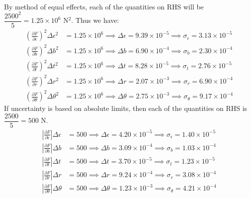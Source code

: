 \documentclass[a4paper, 11pt]{article}
\let\e\epsilon
\begin{document}
\begin{enumerate}[label=(\arabic*),leftmargin=*]
\begin{align*}
\end{align*}
By method of equal effects, each of the quantities on RHS will be $\dfrac{2500^2}{5}=1.25\times 10^6$ N$^2$. Thus we have:
\begin{align*}
	\left(\frac{\partial F}{\partial \e}\right)^2\Delta{\e}^2&=1.25\times 10^6\implies \Delta{\e}=9.39\times 10^{-5}\implies \boxed{\sigma_{\e}=3.13\times 10^{-5}}\\
	\left(\frac{\partial F}{\partial b}\right)^2\Delta{b}^2&=1.25\times 10^6\implies \Delta{b}=6.90\times 10^{-4}\implies \boxed{\sigma_{b}=2.30\times 10^{-4}}\\
	\left(\frac{\partial F}{\partial t}\right)^2\Delta{t}^2&=1.25\times 10^6\implies \Delta{t}=8.28\times 10^{-5}\implies \boxed{\sigma_{t}=2.76\times 10^{-5}}\\
	\left(\frac{\partial F}{\partial r}\right)^2\Delta{r}^2&=1.25\times 10^6\implies \Delta{r}=2.07\times 10^{-3}\implies \boxed{\sigma_{r}=6.90\times 10^{-4}}\\
	\left(\frac{\partial F}{\partial \theta}\right)^2\Delta{\theta}^2&=1.25\times 10^6\implies \Delta{\theta}=2.75\times 10^{-3}\implies \boxed{\sigma_{\theta}=9.17\times 10^{-4}}
\end{align*}
If uncertainty is based on absolute limits, then each of the quantities on RHS is $\dfrac{2500}{5}=500$ N.
\begin{align*}
	\left|\frac{\partial F}{\partial \e}\right|\Delta{\e}&=500\implies \Delta{\e}=4.20\times 10^{-5}\implies \boxed{\sigma_{\e}=1.40\times 10^{-5}}\\
	\left|\frac{\partial F}{\partial b}\right|\Delta{b}&=500\implies \Delta{b}=3.09\times 10^{-4}\implies \boxed{\sigma_{b}=1.03\times 10^{-4}}\\
	\left|\frac{\partial F}{\partial t}\right|\Delta{t}&=500\implies \Delta{t}=3.70\times 10^{-5}\implies \boxed{\sigma_{t}=1.23\times 10^{-5}}\\
	\left|\frac{\partial F}{\partial r}\right|\Delta{r}&=500\implies \Delta{r}=9.24\times 10^{-4}\implies \boxed{\sigma_{r}=3.08\times 10^{-4}}\\
	\left|\frac{\partial F}{\partial \theta}\right|\Delta{\theta}&=500\implies \Delta{\theta}=1.23\times 10^{-3}\implies \boxed{\sigma_{\theta}=4.21\times 10^{-4}}
\end{align*}
\end{enumerate}
\end{document}
